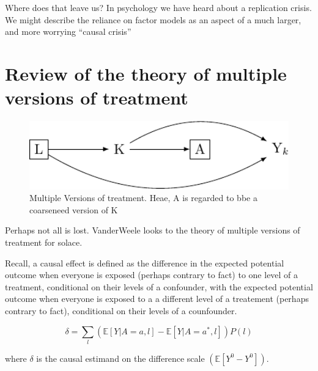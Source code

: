 \documentclass[
  singlecolumn]{report}
\begin{document}
Where does that leave us? In psychology we have heard about a
replication crisis. We might describe the reliance on factor models as
an aspect of a much larger, and more worrying ``causal crisis''

\hypertarget{review-of-the-theory-of-multiple-versions-of-treatment}{%
\section{Review of the theory of multiple versions of
treatment}\label{review-of-the-theory-of-multiple-versions-of-treatment}}

\begin{figure}

{\centering \includegraphics[width=1\textwidth,height=\textheight]{causal-dags_files/figure-pdf/fig_dag_multiple_version_treatment_dag-1.pdf}

}

\caption{Multiple Versions of treatment. Heae, A is regarded to bbe a
coarseneed version of K}

\end{figure}

Perhaps not all is lost. VanderWeele looks to the theory of multiple
versions of treatment for solace.

Recall, a causal effect is defined as the difference in the expected
potential outcome when everyone is exposed (perhaps contrary to fact) to
one level of a treatment, conditional on their levels of a confounder,
with the expected potential outcome when everyone is exposed to a a
different level of a treatement (perhaps contrary to fact), conditional
on their levels of a counfounder.

\[ \delta = \sum_l \left( \mathbb{E}[Y|A=a,l] - \mathbb{E}[Y|A=a^*,l] \right) P(l)\]

where \(\delta\) is the causal estimand on the difference scale
\((\mathbb{E}[Y^0 - Y^0])\).
\end{document}
